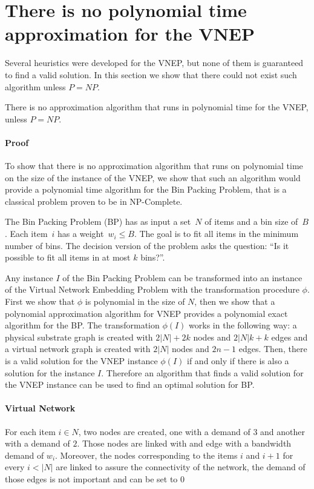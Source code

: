 \section{There is no polynomial time approximation for the VNEP}
Several heuristics were developed for the VNEP, but none of them is guaranteed to find a valid solution. In this section we show that there could not exist such algorithm unless $P=NP$.

\begin{theorem} \label{th:noapprox}
  There is no approximation algorithm that runs in polynomial time for the VNEP, unless $P=NP$.
\end{theorem}

\paragraph{Proof} To show that there is no approximation algorithm that runs on polynomial time on the size of the instance of the VNEP, we show that such an algorithm would provide a polynomial time algorithm for the Bin Packing Problem, that is a classical problem proven to be in NP-Complete.

The Bin Packing Problem (BP) has as input a set~$N$ of items and a bin size of~$B$.  Each item~$i$ has a weight~$w_{i} \leq B$. The goal is to fit all items in the minimum number of bins. The decision version of the problem asks the question: ``Is it possible to fit all items in at most $k$ bins?''.

Any instance $I$ of the Bin Packing Problem can be transformed into an instance of the Virtual Network Embedding Problem with the transformation procedure $\phi$. First we show that $\phi$ is polynomial in the size of $N$, then we show that a polynomial approximation algorithm for VNEP provides a polynomial exact algorithm for the BP\@. The transformation $\phi(I)$ works in the following way: a physical substrate graph is created with $2|N| + 2k$ nodes and $2|N|k + k$ edges and a virtual network graph is created with $2|N|$ nodes and $2n - 1$ edges. Then, there is a valid solution for the VNEP instance $\phi(I)$ if and only if there is also a solution for the instance $I$. Therefore an algorithm that finds a valid solution for the VNEP instance can be used to find an optimal solution for BP.

\paragraph{Virtual Network} For each item $i \in N$, two nodes are created, one with a demand of $3$ and another with a demand of $2$. Those nodes are linked with and edge with a bandwidth demand of $w_{i}$. Moreover, the nodes corresponding to the items $i$ and $i+1$ for every $i < |N|$ are linked to assure the connectivity of the network, the demand of those edges is not important and can be set to $0$

